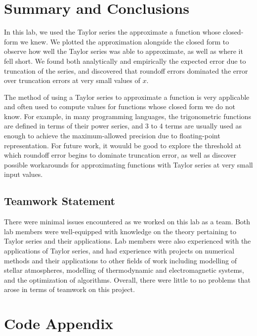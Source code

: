 \documentclass[letter,11pt]{article}
\begin{document}
\begin{enumerate}[label=\alph*.]
\section{Summary and Conclusions}

In this lab, we used the Taylor series the approximate a function whose closed-form we knew. We plotted the approximation alongside the closed form to observe how well the Taylor series was able to approximate, as well as where it fell short. We found both analytically and empirically the expected error due to truncation of the series, and discovered that roundoff errors dominated the error over truncation errors at very small values of $x$.

The method of using a Taylor series to approximate a function is very applicable and often used to compute values for functions whose closed form we do not know. For example, in many programming languages, the trigonometric functions are defined in terms of their power series, and 3 to 4 terms are usually used as enough to achieve the maximum-allowed precision due to floating-point representation. For future work, it wouuld be good to explore the threshold at which roundoff error begins to dominate truncation error, as well as discover possible workarounds for approximating functions with Taylor series at very small input values.

\begin{thebibliography}{99}
\end{thebibliography}

\subsection*{Teamwork Statement}
There were minimal issues encountered as we worked on this lab as a team.
Both lab members were well-equipped with knowledge on the theory pertaining to Taylor series and their applications.
Lab members were also experienced with the applications of Taylor series, and had experience with projects on numerical methods and their applications to other fields of work including modelling of stellar atmospheres, modelling of thermodynamic and electromagnetic systems, and the optimization of algorithms.
Overall, there were little to no problems that arose in terms of teamwork on this project.

\section*{Code Appendix}


\end{enumerate}
\end{document}
